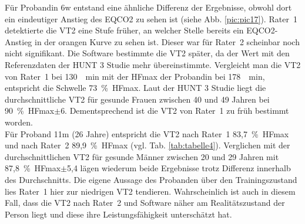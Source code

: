 Für Probandin 6w entstand eine ähnliche Differenz der Ergebnisse, obwohl dort ein eindeutiger Anstieg des \gls{EQCO2} zu sehen ist (siehe Abb. \ref{pic:pic17}). Rater~1 detektierte die VT2 eine Stufe früher, an welcher Stelle bereits ein \gls{EQCO2}-Anstieg in der orangen Kurve zu sehen ist. Dieser war für Rater~2 scheinbar noch nicht signifikant. Die Software bestimmte die VT2 später, da der Wert mit den Referenzdaten der HUNT 3 Studie mehr übereinstimmte. Vergleicht man die VT2 von Rater~1 bei \SI{130}{\per\minute} mit der \gls{HFmax} der Probandin bei \SI{178}{\per\minute}, entspricht die Schwelle 73~\%~\gls{HFmax}. Laut der HUNT 3 Studie liegt die durchschnittliche VT2 für gesunde Frauen zwischen 40 und 49 Jahren bei 90~\%~\gls{HFmax}$\pm$6. Dementsprechend ist die VT2 von Rater~1 zu früh bestimmt worden.\\
Für Proband 11m (26 Jahre) entspricht die VT2 nach Rater~1 83,7~\%~\gls{HFmax} und nach Rater~2 89,9~\%~\gls{HFmax} (vgl. Tab. \ref{tab:tabelle4}). Verglichen mit der durchschnittlichen VT2 für gesunde Männer zwischen 20 und 29 Jahren mit 87,8~\%~\gls{HFmax}$\pm$5,4 lägen wiederum beide Ergebnisse trotz Differenz innerhalb des Durchschnitts. Die eigene Aussage des Probanden über den Trainingszustand lies Rater~1 hier zur niedrigen VT2 tendieren. Wahrscheinlich ist auch in diesem Fall, dass die VT2 nach Rater~2 und Software näher am Realitätszustand der Person liegt und diese ihre Leistungsfähigkeit unterschätzt hat.
%
